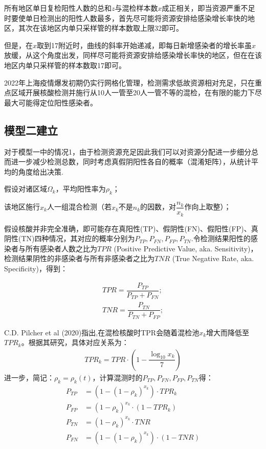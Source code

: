 \documentclass[withoutpreface,bwprint]{cumcmthesis} %
\begin{document}
所有地区单日复检阳性人数的总和$z$与混检样本数$x$成正相关，即当资源严重不足时要使单日检测出的阳性人数最多，首先尽可能将资源安排给感染增长率快的地区，其次在该地区内单只采样管的样本数取上限32即可。

但是，在$x$取到17附近时，曲线的斜率开始递减，即每日新增感染者的增长率虽$x$放缓，从这个角度出发，同样尽可能将资源安排给感染增长率快的地区，但在在该地区内单只采样管的样本数取17即可。

2022年上海疫情爆发初期仍实行网格化管理，检测需求低故资源相对充足，只在重点区域开展核酸检测并施行从10人一管至20人一管不等的混检，在有限的能力下尽最大可能得定位阳性感染者。

\subsection{模型二建立}
对于模型一中的情况1，由于检测资源充足因此我们可以对资源分配进一步细分总而进一步减少检测总数，同时考虑真假阴阳性各自的概率（混淆矩阵），从统计平均的角度给出决策.


假设对诸区域$\Omega_k$，平均阳性率为$\rho_k$；

该地区施行$x_k$人一组混合检测（若$x_k$不是$n_k$的因数，对$\dfrac{n_k}{x_k}$作向上取整）；

假设核酸并非完全准确，即可能存在真阳性(TP)、假阴性(FN)、假阳性(FP)、真阴性(TN)四种情况，其对应的概率分别为$P_{TP},P_{FN},P_{FP},P_{TN}$.令检测结果阳性的感染者与所有感染者人数之比为$TPR$ (Positive Predictive Value, aka. Sensitivity)，检测结果阴性的非感染者与所有非感染者之比为$TNR$ (True Negative Rate, aka. Specificity)，得到：

\begin{align}
\label{TPR}
    TPR=\dfrac{P_{TP}}{P_{TP}+P_{FN}};  \\
    TNR=\dfrac{P_{TN}}{P_{TN}+P_{FP}};  
\end{align}

C.D. Pilcher et al (2020)\cite{bib1}指出,在混检核酸时TPR会随着混检池$x_k$增大而降低至$TPR_k$。根据其研究，具体对应关系为：
\begin{align}
    TPR_k=TPR\cdot (1-\dfrac{\log_{10}x_k}{7})
\end{align}
进一步，简记：$\rho_k =\rho_k(t)$，计算混测时的$P_{TP},P_{FN},P_{FP},P_{TN}$得：
\begin{align}
    P_{TP}&=(1-(1-\rho_k)^{x_k})\cdot TPR_k\\
    P_{FP}&=(1-\rho_k)^{x_k}\cdot(1-TPR_k)\\
    P_{TN}&=(1-\rho_k)^{x_k}\cdot TNR\\
    P_{FN}&=(1-(1-\rho_k)^{x_k})\cdot (1-TNR)
    \label{FN}
\end{align}
\end{document}
